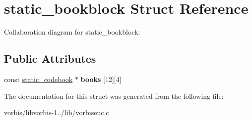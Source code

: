 \hypertarget{structstatic__bookblock}{\section{static\+\_\+bookblock Struct Reference}
\label{structstatic__bookblock}
}


Collaboration diagram for static\+\_\+bookblock\+:
\subsection*{Public Attributes}
\begin{DoxyCompactItemize}
\item 
\hypertarget{structstatic__bookblock_ad5de4a859b40179c2b5157e7409c92d0}{const \hyperlink{structstatic__codebook}{static\+\_\+codebook} $\ast$ {\bfseries books} \mbox{[}12\mbox{]}\mbox{[}4\mbox{]}}\label{structstatic__bookblock_ad5de4a859b40179c2b5157e7409c92d0}

\end{DoxyCompactItemize}


The documentation for this struct was generated from the following file\+:\begin{DoxyCompactItemize}
\item 
vorbis/libvorbis-\/1../lib/vorbisenc.\+c\end{DoxyCompactItemize}

